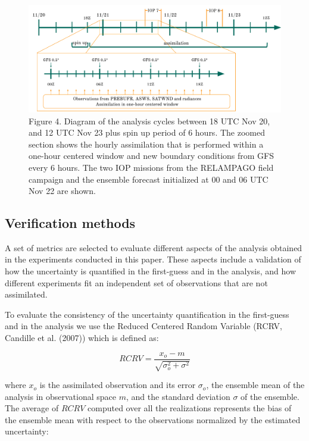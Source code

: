 \documentclass[authoryear,preprint,review,12pt]{elsarticle} %
\begin{document}
\begin{figure}
\includegraphics[width=1\linewidth]{../figures/analysis_cycle} \caption{Figure 4. Diagram of the analysis cycles between 18 UTC Nov 20, and 12 UTC Nov 23 plus spin up period of 6 hours. The zoomed section shows the hourly assimilation that is performed within a one-hour centered window and new boundary conditions from GFS every 6 hours. The two IOP missions from the RELAMPAGO field campaign and the ensemble forecast initialized at 00 and 06 UTC Nov 22 are shown.}\label{fig:cycle}
\end{figure}

\hypertarget{verification-methods}{%
\subsection{Verification methods}\label{verification-methods}}

A set of metrics are selected to evaluate different aspects of the analysis obtained in the experiments conducted in this paper. These aspects include a validation of how the uncertainty is quantified in the first-guess and in the analysis, and how different experiments fit an independent set of observations that are not assimilated.

To evaluate the consistency of the uncertainty quantification in the first-guess and in the analysis we use the Reduced Centered Random Variable (RCRV, Candille et al. (2007)) which is defined as:

\[RCRV = \frac{x_o - m}{\sqrt{\sigma_o^2 + \sigma^2}}\]

where \(x_o\) is the assimilated observation and its error \(\sigma_o\), the ensemble mean of the analysis in observational space \(m\), and the standard deviation \(\sigma\) of the ensemble.
The average of \(RCRV\) computed over all the realizations represents the bias of the ensemble mean with respect to the observations normalized by the estimated uncertainty:
\end{document}
